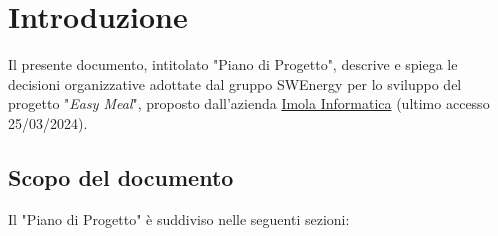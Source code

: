 \section{Introduzione}

Il presente documento, intitolato "Piano di Progetto", descrive e spiega le
decisioni organizzative adottate dal gruppo SWEnergy per lo sviluppo del
progetto "\textit{Easy Meal}", proposto dall'azienda
\href{https://imolainformatica.it/}{Imola Informatica} (ultimo accesso 25/03/2024).

\subsection{Scopo del documento}

Il "Piano di Progetto" è suddiviso nelle seguenti sezioni:

